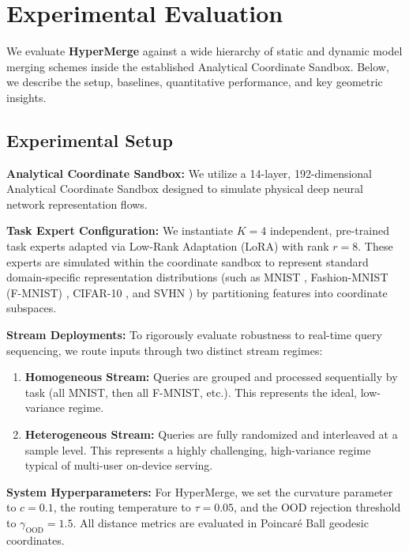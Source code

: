 \section{Experimental Evaluation}
\label{sec:experiments}

We evaluate \textbf{HyperMerge} against a wide hierarchy of static and dynamic model merging schemes inside the established Analytical Coordinate Sandbox. Below, we describe the setup, baselines, quantitative performance, and key geometric insights.

\subsection{Experimental Setup}
\label{subsec:setup}
\textbf{Analytical Coordinate Sandbox:} We utilize a 14-layer, 192-dimensional Analytical Coordinate Sandbox designed to simulate physical deep neural network representation flows. 

\textbf{Task Expert Configuration:} We instantiate $K = 4$ independent, pre-trained task experts adapted via Low-Rank Adaptation (LoRA) \cite{hu2021lora} with rank $r=8$. These experts are simulated within the coordinate sandbox to represent standard domain-specific representation distributions (such as MNIST \cite{lecun1998gradient}, Fashion-MNIST (F-MNIST) \cite{xiao2017fashion}, CIFAR-10 \cite{krizhevsky2009learning}, and SVHN \cite{netzer2011reading}) by partitioning features into coordinate subspaces.

\textbf{Stream Deployments:} To rigorously evaluate robustness to real-time query sequencing, we route inputs through two distinct stream regimes:
\begin{enumerate}
    \item \textbf{Homogeneous Stream:} Queries are grouped and processed sequentially by task (all MNIST, then all F-MNIST, etc.). This represents the ideal, low-variance regime.
    \item \textbf{Heterogeneous Stream:} Queries are fully randomized and interleaved at a sample level. This represents a highly challenging, high-variance regime typical of multi-user on-device serving.
\end{enumerate}

\textbf{System Hyperparameters:} For HyperMerge, we set the curvature parameter to $c = 0.1$, the routing temperature to $\tau = 0.05$, and the OOD rejection threshold to $\gamma_{\text{OOD}} = 1.5$. All distance metrics are evaluated in Poincaré Ball geodesic coordinates.

